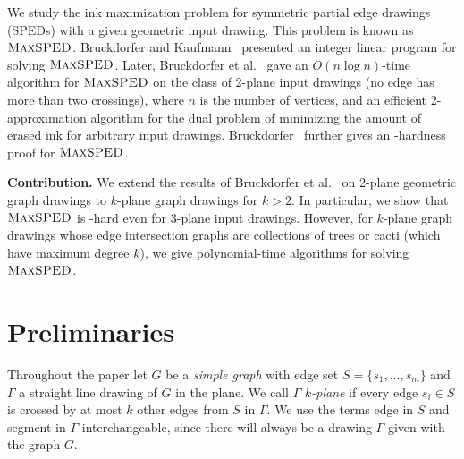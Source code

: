 \documentclass[a4paper,english,numberwithinsect]{eurocg18}
\newcommand{\maxsped}{\ensuremath{\textsc{MaxSPED}}\xspace}
\begin{document}
We study the ink maximization problem for symmetric partial edge drawings (SPEDs) with a given geometric input drawing.
This problem is known as \maxsped. 
Bruckdorfer and Kaufmann~\cite{bk-ecbe-12} presented an integer linear program for solving \maxsped. 
Later, Bruckdorfer et al.~\cite{bcgkmn-pped-17} gave an $O(n \log n)$-time algorithm for \maxsped on the class of 2-plane input drawings (no edge has more than two crossings), where $n$ is the number of vertices, and an efficient 2-approximation algorithm for the dual problem of minimizing the amount of erased ink for arbitrary input drawings.
Bruckdorfer~\cite{b-sgh-15} further gives an \NP-hardness proof for \maxsped.

\medskip

\noindent\textbf{Contribution.} We extend the results of Bruckdorfer et al.~\cite{bcgkmn-pped-17} on 2-plane geometric graph drawings to $k$-plane graph drawings for $k > 2$. 
In particular, we show that \maxsped is \NP-hard even for 3-plane input drawings. 
However, for $k$-plane graph drawings whose edge intersection graphs are collections of trees or cacti (which have maximum degree $k$), we give polynomial-time algorithms for solving \maxsped.





\section{Preliminaries}\label{sec:preliminaries}

Throughout the paper let $ G $ be a \emph{simple graph} with edge set $ S = \{s_1,\dots,s_m\}$ and $ \Gamma $ a straight line drawing of $ G $ in the plane. We call $ \Gamma $ \emph{$ k $-plane} if every edge $ s_i \in S $ is crossed by at most $ k $ other edges from $ S $ in $ \Gamma $. We use the terms edge in $ S $ and segment in $ \Gamma $ interchangeable, since there will always be a drawing $ \Gamma $ given with the graph $ G $. 
\end{document}
